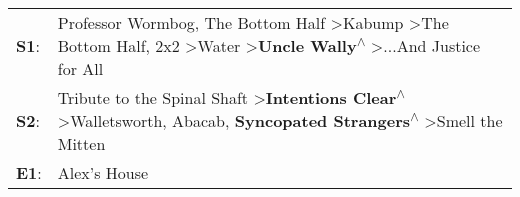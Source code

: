 \begin{supertabular}{p{0.03\textwidth}p{0.92\textwidth}}
 \textbf{S1}:  &  Professor Wormbog\textsuperscript{}, \enspace The Bottom Half\textsuperscript{} \textgreater \enspace Kabump\textsuperscript{} \textgreater \enspace The Bottom Half\textsuperscript{}, \enspace 2x2\textsuperscript{} \textgreater \enspace Water\textsuperscript{} \textgreater \enspace \textbf{Uncle Wally\textsuperscript{$\wedge$}} \textgreater \enspace ...And Justice for All\textsuperscript{}  \enspace  \\
 \textbf{S2}:  &                                                                Tribute to the Spinal Shaft\textsuperscript{} \textgreater \enspace \textbf{Intentions Clear\textsuperscript{$\wedge$}} \textgreater \enspace Walletsworth\textsuperscript{}, \enspace Abacab\textsuperscript{}, \enspace \textbf{Syncopated Strangers\textsuperscript{$\wedge$}} \textgreater \enspace Smell the Mitten\textsuperscript{}  \enspace  \\
 \textbf{E1}:  &                                                                                                                                                                                                                                                                                                                                                                            Alex's House\textsuperscript{}  \enspace  \\
\end{supertabular}
